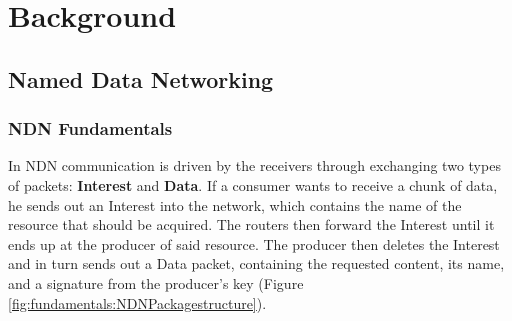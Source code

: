\chapter{Background} \label{chapter:Background}



\section{Named Data Networking}

\subsection{NDN Fundamentals}


 In NDN communication is driven by the receivers through exchanging two types of packets: \textbf{Interest} and \textbf{Data}. If a consumer wants to receive a chunk of data, he sends out an Interest into the network, which contains the name of the resource that should be acquired. The routers then forward the Interest until it ends up at the producer of said resource. The producer then deletes the Interest and in turn sends out a Data packet, containing the requested content, its name, and a signature from the producer's key (Figure \ref{fig:fundamentals:NDNPackagestructure}). 
 
